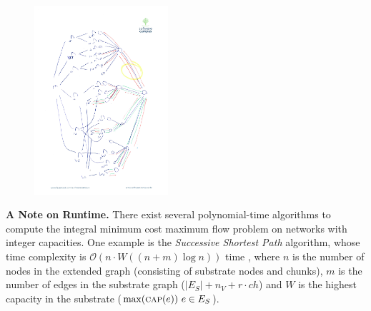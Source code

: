 \documentclass[9pt,twocolumn]{scrartcl}
\newcommand{\Capacity}{\ensuremath{\textsc{cap}}}
\newcommand{\RedundancyFactor}{\ensuremath{r}}
\newcommand{\SubstrateEdges}{\ensuremath{E_S}}
\newcommand{\SubstrateEdge}{\ensuremath{e}}
\newcommand{\Vms}{\ensuremath{n_V}}
\newcommand{\ChunkTypes}{\ensuremath{ch}}
\begin{document}
\begin{figure}
\includegraphics[angle=90,origin=c, height=7cm]{figs/model_fig_skteches/flow}
\end{figure}


\textbf{A Note on Runtime.} There exist several polynomial-time algorithms to compute 
the integral minimum cost maximum flow problem on networks with integer capacities. 
One example is the \emph{Successive Shortest Path} algorithm,
whose time complexity is $\mathcal{O}(n \cdot W((n+m)\log n)
)$ time \cite{successive_shortest_path_complexity}, where $n$ is the number of
nodes in the extended graph (consisting of substrate nodes and chunks), 
$m$ is the number of edges in the substrate graph ($|\SubstrateEdges| + \Vms + \RedundancyFactor
\cdot \ChunkTypes$) and $W$ is the highest capacity in the substrate
($\max(\Capacity(\SubstrateEdge))~\SubstrateEdge\in\SubstrateEdges$).
\end{document}
